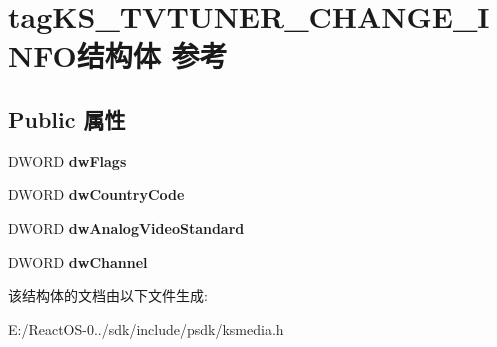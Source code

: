 \hypertarget{structtag_k_s___t_v_t_u_n_e_r___c_h_a_n_g_e___i_n_f_o}{}\section{tag\+K\+S\+\_\+\+T\+V\+T\+U\+N\+E\+R\+\_\+\+C\+H\+A\+N\+G\+E\+\_\+\+I\+N\+F\+O结构体 参考}
\label{structtag_k_s___t_v_t_u_n_e_r___c_h_a_n_g_e___i_n_f_o}
\subsection*{Public 属性}
\begin{DoxyCompactItemize}
\item 
\mbox{\label{structtag_k_s___t_v_t_u_n_e_r___c_h_a_n_g_e___i_n_f_o_ac4a60d39fb1809d143d7f30021c4ee67}} 
D\+W\+O\+RD {\bfseries dw\+Flags}
\item 
\mbox{\label{structtag_k_s___t_v_t_u_n_e_r___c_h_a_n_g_e___i_n_f_o_a3658f9c947c17aa87da9e4869a5f2b8e}} 
D\+W\+O\+RD {\bfseries dw\+Country\+Code}
\item 
\mbox{\label{structtag_k_s___t_v_t_u_n_e_r___c_h_a_n_g_e___i_n_f_o_abb514f964e558a85d1052e0fa32437ee}} 
D\+W\+O\+RD {\bfseries dw\+Analog\+Video\+Standard}
\item 
\mbox{\label{structtag_k_s___t_v_t_u_n_e_r___c_h_a_n_g_e___i_n_f_o_af9bd59103584bea062bba41d19709817}} 
D\+W\+O\+RD {\bfseries dw\+Channel}
\end{DoxyCompactItemize}


该结构体的文档由以下文件生成\+:\begin{DoxyCompactItemize}
\item 
E\+:/\+React\+O\+S-\/0../sdk/include/psdk/ksmedia.\+h\end{DoxyCompactItemize}
